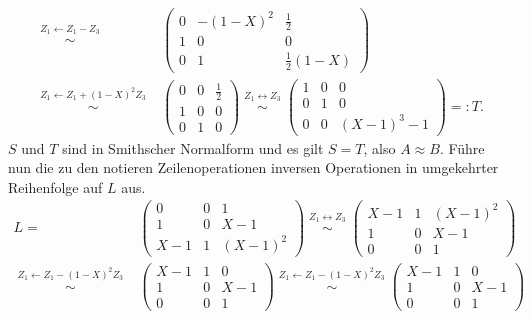\documentclass[../../main.tex]{subfiles}
\begin{document}
\begin{bsp}
\begin{align*}
\stackrel{\begin{smallmatrix}Z_1\leftarrow Z_1-Z_3\end{smallmatrix}}{\sim}&\begin{pmatrix}0&-(1-X)^2&\frac{1}{2}\\1&0&0\\0&1&\frac{1}{2}(1-X)\end{pmatrix}\\
\stackrel{\begin{smallmatrix}Z_1\leftarrow Z_1+(1-X)^2Z_3\end{smallmatrix}}{\sim}&\begin{pmatrix}0&0&\frac{1}{2}\\1&0&0\\0&1&0\end{pmatrix}
\stackrel{\begin{smallmatrix}Z_1\leftrightarrow Z_3\end{smallmatrix}}{\sim}\begin{pmatrix}1&0&0\\0&1&0\\0&0&(X-1)^3-1\end{pmatrix}=:T.
\end{align*}
$S$ und $T$ sind in Smithscher Normalform und es gilt $S=T$, also $A\approx B$. Führe nun die zu den notieren Zeilenoperationen inversen Operationen in umgekehrter Reihenfolge auf $L$ aus.
\begin{align*}
L=&\begin{pmatrix}0&0&1\\1&0&X-1\\X-1&1&(X-1)^2\end{pmatrix}\stackrel{\begin{smallmatrix}Z_1\leftrightarrow Z_3\end{smallmatrix}}{\sim}\begin{pmatrix}X-1&1&(X-1)^2\\1&0&X-1\\0&0&1\end{pmatrix}\\
\stackrel{\begin{smallmatrix}Z_1\leftarrow Z_1-(1-X)^2Z_3\end{smallmatrix}}{\sim}&\begin{pmatrix}X-1&1&0\\1&0&X-1\\0&0&1\end{pmatrix}\stackrel{\begin{smallmatrix}Z_1\leftarrow Z_1-(1-X)^2Z_3\end{smallmatrix}}{\sim}\begin{pmatrix}X-1&1&0\\1&0&X-1\\0&0&1\end{pmatrix}\\

\end{align*}
\end{bsp}
\end{document}
